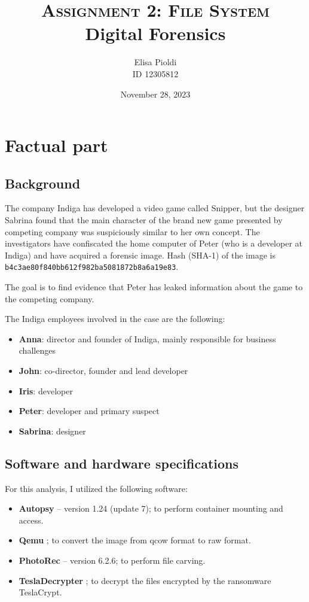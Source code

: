 \documentclass[12pt]{article}
\title{\textbf{\textsc{Assignment 2: File System}}\\Digital Forensics}
\author{Elisa Pioldi\\
        ID 12305812}
\date{November 28, 2023}
\begin{document}
\maketitle

\section{Factual part}

\subsection{Background}

The company Indiga has developed a video game called Snipper, but the designer Sabrina found that the main character of the brand new game presented by competing company was suspiciously similar to her own concept.
The investigators have confiscated the home computer of Peter (who is a developer at Indiga) and have acquired a forensic image. 
Hash (SHA-1) of the image is \texttt{b4c3ae80f840bb612f982ba5081872b8a6a19e83}.

The goal is to find evidence that Peter has leaked information about the game to the competing company.

The Indiga employees involved in the case are the following:
\begin{itemize}
    \item \textbf{Anna}: director and founder of Indiga, mainly responsible for business challenges
    \item \textbf{John}: co-director, founder and lead developer
    \item \textbf{Iris}: developer
    \item \textbf{Peter}: developer and primary suspect
    \item \textbf{Sabrina}: designer
\end{itemize}

\subsection{Software and hardware specifications}
\label{sec:specs}

For this analysis, I utilized the following software:

\begin{itemize}
    \item \textbf{Autopsy} \cite{autopsy} -- version 1.24 (update 7); to perform container mounting and access.
    \item \textbf{Qemu} \cite{qemu}; to convert the image from qcow format to raw format.
    \item \textbf{PhotoRec} \cite{photorec} -- version 6.2.6; to perform file carving. 
    \item \textbf{TeslaDecrypter} \cite{tesla-decrypt}; to decrypt the files encrypted by the ransomware TeslaCrypt.
\end{itemize}
\end{document}
